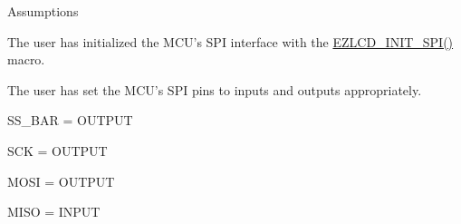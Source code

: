 \begin{DoxyParagraph}{Assumptions}

\begin{DoxyItemize}
\item The user has initialized the M\-C\-U's S\-P\-I interface with the \hyperlink{group__ez_l_c_d__103__common_gaf5c3b2dedc950d34e0381946fbb32428}{E\-Z\-L\-C\-D\-\_\-\-I\-N\-I\-T\-\_\-\-S\-P\-I()} macro.
\item The user has set the M\-C\-U's S\-P\-I pins to inputs and outputs appropriately. \par
\par

\begin{DoxyItemize}
\item S\-S\-\_\-\-B\-A\-R = O\-U\-T\-P\-U\-T
\item S\-C\-K = O\-U\-T\-P\-U\-T
\item M\-O\-S\-I = O\-U\-T\-P\-U\-T
\item M\-I\-S\-O = I\-N\-P\-U\-T 
\end{DoxyItemize}
\end{DoxyItemize}
\end{DoxyParagraph}
